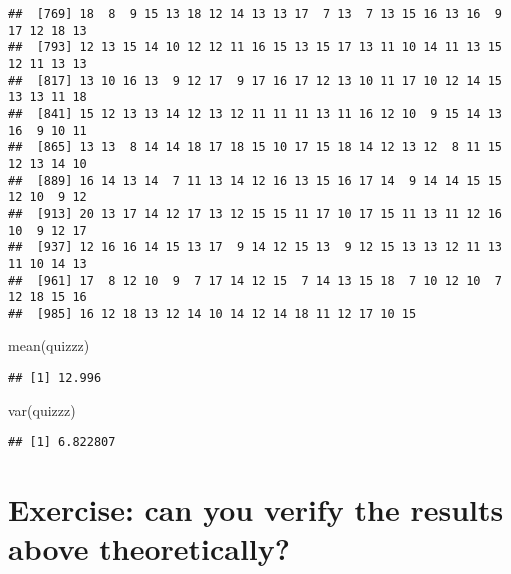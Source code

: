 \documentclass[
]{article}
\newenvironment{Shaded}{\begin{snugshade}}{\end{snugshade}}
\newcommand{\FunctionTok}[1]{\textcolor[rgb]{0.00,0.00,0.00}{#1}}
\newcommand{\NormalTok}[1]{#1}
\begin{document}
\begin{verbatim}
##  [769] 18  8  9 15 13 18 12 14 13 13 17  7 13  7 13 15 16 13 16  9 17 12 18 13
##  [793] 12 13 15 14 10 12 12 11 16 15 13 15 17 13 11 10 14 11 13 15 12 11 13 13
##  [817] 13 10 16 13  9 12 17  9 17 16 17 12 13 10 11 17 10 12 14 15 13 13 11 18
##  [841] 15 12 13 13 14 12 13 12 11 11 11 13 11 16 12 10  9 15 14 13 16  9 10 11
##  [865] 13 13  8 14 14 18 17 18 15 10 17 15 18 14 12 13 12  8 11 15 12 13 14 10
##  [889] 16 14 13 14  7 11 13 14 12 16 13 15 16 17 14  9 14 14 15 15 12 10  9 12
##  [913] 20 13 17 14 12 17 13 12 15 15 11 17 10 17 15 11 13 11 12 16 10  9 12 17
##  [937] 12 16 16 14 15 13 17  9 14 12 15 13  9 12 15 13 13 12 11 13 11 10 14 13
##  [961] 17  8 12 10  9  7 17 14 12 15  7 14 13 15 18  7 10 12 10  7 12 18 15 16
##  [985] 16 12 18 13 12 14 10 14 12 14 18 11 12 17 10 15
\end{verbatim}

\begin{Shaded}
\begin{Highlighting}[]
\FunctionTok{mean}\NormalTok{(quizzz)}
\end{Highlighting}
\end{Shaded}

\begin{verbatim}
## [1] 12.996
\end{verbatim}

\begin{Shaded}
\begin{Highlighting}[]
\FunctionTok{var}\NormalTok{(quizzz)}
\end{Highlighting}
\end{Shaded}

\begin{verbatim}
## [1] 6.822807
\end{verbatim}

\hypertarget{exercise-can-you-verify-the-results-above-theoretically}{%
\section{Exercise: can you verify the results above
theoretically?}\label{exercise-can-you-verify-the-results-above-theoretically}}
\end{document}
